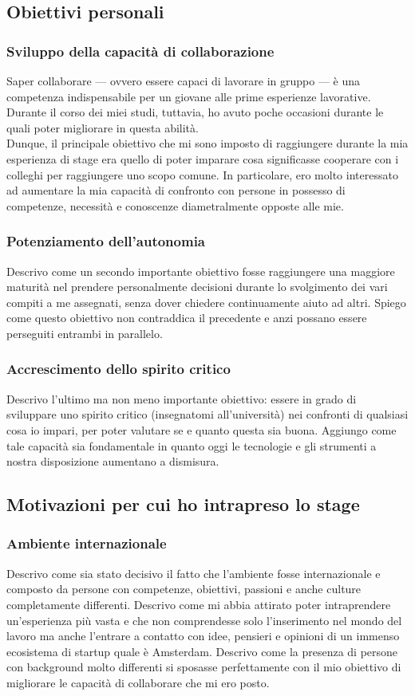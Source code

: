		\subsection{Obiettivi personali}
			\subsubsection{Sviluppo della capacità di collaborazione}
				Saper collaborare — ovvero essere capaci di lavorare in gruppo — è una competenza indispensabile per un giovane alle
				prime esperienze lavorative. Durante il corso dei miei studi, tuttavia, ho avuto poche occasioni durante le quali
				poter migliorare in questa abilità.\\
				Dunque, il principale obiettivo che mi sono imposto di raggiungere durante la mia esperienza di stage era quello di
				poter imparare cosa significasse cooperare con i colleghi per raggiungere uno scopo comune. In particolare, ero molto
				interessato ad aumentare la mia capacità di confronto con persone in possesso di competenze, necessità e conoscenze
				diametralmente opposte alle mie.
			\subsubsection{Potenziamento dell'autonomia}
				Descrivo come un secondo importante obiettivo fosse raggiungere una maggiore maturità nel prendere personalmente
				decisioni durante lo svolgimento dei vari compiti a me assegnati, senza dover chiedere continuamente aiuto ad altri.
				Spiego come questo obiettivo non contraddica il precedente e anzi possano essere perseguiti entrambi in parallelo.
			\subsubsection{Accrescimento dello spirito critico}
				Descrivo l'ultimo ma non meno importante obiettivo: essere in grado di sviluppare uno spirito critico (insegnatomi
				all'università) nei confronti di qualsiasi cosa io impari, per poter valutare se e quanto questa sia buona. Aggiungo
				come tale capacità sia fondamentale in quanto oggi le tecnologie e gli strumenti a nostra disposizione aumentano a
				dismisura.
		\subsection{Motivazioni per cui ho intrapreso lo stage}
			\subsubsection{Ambiente internazionale}
				Descrivo come sia stato decisivo il fatto che l'ambiente fosse internazionale e composto da persone con competenze,
				obiettivi, passioni e anche culture completamente differenti. Descrivo come mi abbia attirato poter intraprendere
				un'esperienza più vasta e che non comprendesse solo l'inserimento nel mondo del lavoro ma anche l'entrare a contatto
				con idee, pensieri e opinioni di un immenso ecosistema di startup quale è Amsterdam. Descrivo come la presenza di
				persone con background molto differenti si sposasse perfettamente con il mio obiettivo di migliorare le capacità di
				collaborare che mi ero posto.
